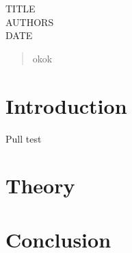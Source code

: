 \documentclass[11pt,a4paper]{article}
\begin{document}
TITLE\\
AUTHORS\\
DATE

\cleardoublepage{}
\begin{abstract}
  okok
\end{abstract}
\cleardoublepage{}
\tableofcontents{}
\section{Introduction}
Pull test

\section{Theory}

\section{Conclusion}
\end{document}
